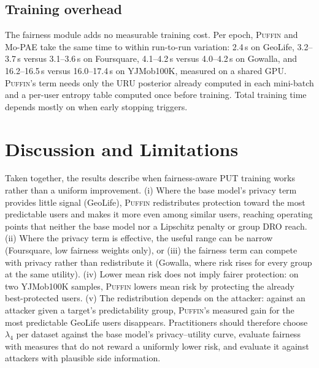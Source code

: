 \documentclass[sigconf,anonymous,review]{acmart}
\newcommand{\puffin}{\textsc{Puffin}}
\begin{document}
\subsection{Training overhead}
The fairness module adds no measurable training cost. Per epoch, \puffin{} and Mo-PAE take the same time to within run-to-run variation: 2.4\,s on GeoLife, 3.2--3.7\,s versus 3.1--3.6\,s on Foursquare, 4.1--4.2\,s versus 4.0--4.2\,s on Gowalla, and 16.2--16.5\,s versus 16.0--17.4\,s on YJMob100K, measured on a shared GPU. \puffin's term needs only the URU posterior already computed in each mini-batch and a per-user entropy table computed once before training. Total training time depends mostly on when early stopping triggers.

\section{Discussion and Limitations}
\label{sec:limitations}
Taken together, the results describe when fairness-aware PUT training works rather than a uniform improvement. (i) Where the base model's privacy term provides little signal (GeoLife), \puffin{} redistributes protection toward the most predictable users and makes it more even among similar users, reaching operating points that neither the base model nor a Lipschitz penalty or group DRO reach. (ii) Where the privacy term is effective, the useful range can be narrow (Foursquare, low fairness weights only), or (iii) the fairness term can compete with privacy rather than redistribute it (Gowalla, where risk rises for every group at the same utility). (iv) Lower mean risk does not imply fairer protection: on two YJMob100K samples, \puffin{} lowers mean risk by protecting the already best-protected users. (v) The redistribution depends on the attacker: against an attacker given a target's predictability group, \puffin's measured gain for the most predictable GeoLife users disappears. Practitioners should therefore choose $\lambda_4$ per dataset against the base model's privacy--utility curve, evaluate fairness with measures that do not reward a uniformly lower risk, and evaluate it against attackers with plausible side information.
\end{document}
